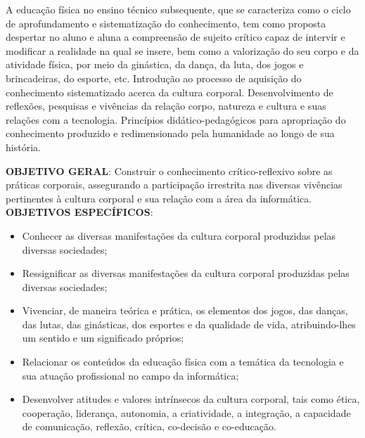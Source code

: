 \begin{pud}

	
	\ementa
	A educação física no ensino técnico subsequente, que se caracteriza como o ciclo de aprofundamento e sistematização do conhecimento, tem como proposta despertar no aluno e aluna a compreensão de sujeito crítico capaz de intervir e modificar a realidade na qual se insere, bem como a valorização do seu corpo e da atividade física, por meio da ginástica, da dança, da luta, dos jogos e brincadeiras, do esporte, etc. Introdução ao processo de aquisição do conhecimento sistematizado acerca da cultura corporal. Desenvolvimento de reflexões, pesquisas e vivências da relação corpo, natureza e cultura e suas relações com a tecnologia. Princípios didático-pedagógicos para apropriação do conhecimento produzido e redimensionado pela humanidade ao longo de sua história.
	
	\objetivos
	\textbf{OBJETIVO GERAL}:
	Construir o conhecimento crítico-reflexivo sobre as práticas corporais, assegurando a participação irrestrita nas diversas vivências pertinentes à cultura corporal e sua relação com a área da informática.	
	\newline\\	
	\textbf{OBJETIVOS ESPECÍFICOS}:
	\begin{itemize}
		
		\item Conhecer as diversas manifestações da cultura corporal produzidas pelas diversas sociedades;
		\item Ressignificar as diversas manifestações da cultura corporal produzidas pelas diversas sociedades;
		\item  Vivenciar, de maneira teórica e prática, os elementos dos jogos, das danças, das lutas, das ginásticas, dos esportes e da qualidade de vida, atribuindo-lhes um sentido e um significado próprios;
		\item  Relacionar os conteúdos da educação física com a temática da tecnologia e sua atuação profissional no campo da informática;
		\item  Desenvolver atitudes e valores intrínsecos da cultura corporal, tais como ética, cooperação, liderança, autonomia, a criatividade, a integração, a capacidade de comunicação, reflexão, crítica, co-decisão e co-educação. 

	\end{itemize}
	

\end{pud}
